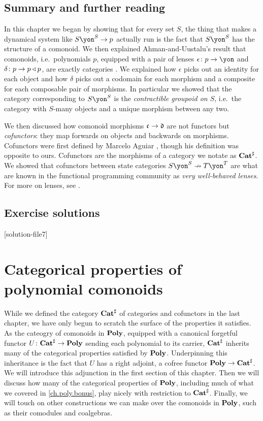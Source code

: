 \documentclass[Book-Poly]{subfiles}
\begin{document}
\section{Summary and further reading}

In this chapter we began by showing that for every set $S$, the thing that makes a dynamical system like $S\yon^S\to p$ actually run is the fact that $S\yon^S$ has the structure of a comonoid.  We then explained Ahman-and-Uustalu's result that comonoids, i.e.\ polynomials $p$, equipped with a pair of lenses $\epsilon\colon p\to\yon$ and $\delta\colon p\to p\mathbin{\triangleleft} p$, are exactly categories \cite{ahman2016directed}. We explained how $\epsilon$ picks out an identity for each object and how $\delta$ picks out a codomain for each morphism and a composite for each composable pair of morphisms. In particular we showed that the category corresponding to $S\yon^S$ is the \emph{contractible groupoid on $S$}, i.e.\ the category with $S$-many objects and a unique morphism between any two.

We then discussed how comonoid morphisms $\mathfrak{c}\to\mathfrak{d}$ are not functors but \emph{cofunctors}: they map forwards on objects and backwards on morphisms. Cofunctors were first defined by Marcelo Aguiar \cite{aguiar1997internal}, though his definition was opposite to ours. Cofunctors are the morphisms of a category we notate as $\mathbf{Cat}^\sharp$. We showed that cofunctors between state categories $S\yon^S\cof T\yon^T$ are what are known in the functional programming community as \emph{very well-behaved lenses}. For more on lenses, see \cite{nlab2022lens}.


\section{Exercise solutions}
{\footnotesize
}

[solution-file7]

\chapter{Categorical properties of polynomial comonoids} \label{ch.comon.cofree}

While we defined the category $\mathbf{Cat}^\sharp$ of categories and cofunctors in the last chapter, we have only begun to scratch the surface of the properties it satisfies.
As the cateogry of comonoids in $\mathbf{Poly}$, equipped with a canonical forgetful functor $U\colon\mathbf{Cat}^\sharp\to\mathbf{Poly}$ sending each polynomial to its carrier, $\mathbf{Cat}^\sharp$ inherits many of the categorical properties satisfied by $\mathbf{Poly}$.
Underpinning this inheritance is the fact that $U$ has a right adjoint, a cofree functor $\mathbf{Poly}\to\mathbf{Cat}^\sharp$.
We will introduce this adjunction in the first section of this chapter.
Then we will discuss how many of the categorical properties of $\mathbf{Poly}$, including much of what we covered in \cref{ch.poly.bonus}, play nicely with restriction to $\mathbf{Cat}^\sharp$.
Finally, we will touch on other constructions we can make over the comonoids in $\mathbf{Poly}$, such as their comodules and coalgebras.
\end{document}
